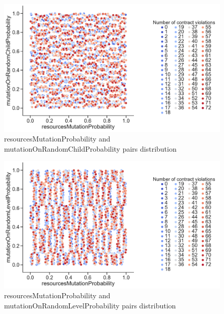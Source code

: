 \begin{figure}
	\centering
	\includegraphics[width=\textwidth]{images/PairsDistr/resourcesMutationProbability_mutationOnRandomChildProbability.pdf}
	\caption[resourcesMutationProbability and mutationOnRandomChildProbability pairs distribution]{resourcesMutationProbability and mutationOnRandomChildProbability pairs distribution}
	\label{fig:resourcesMutationProbability_mutationOnRandomChildProbability_pair}
\end{figure}
\begin{figure}
	\centering
	\includegraphics[width=\textwidth]{images/PairsDistr/resourcesMutationProbability_mutationOnRandomLevelProbability.pdf}
	\caption[resourcesMutationProbability and mutationOnRandomLevelProbability pairs distribution]{resourcesMutationProbability and mutationOnRandomLevelProbability pairs distribution}
	\label{fig:resourcesMutationProbability_mutationOnRandomLevelProbability_pair}
\end{figure}
